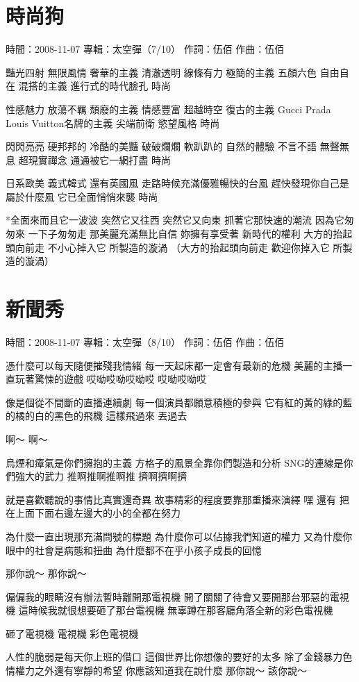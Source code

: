 \documentclass[UTF8,a4paper,oneside,twocolumn,12pt]{ctexbook}
\newcommand{\infopair}[2]{\textbullet #1：#2}
\newcommand{\zc}[1][伍佰]{\infopair{作詞}{#1}}
\newcommand{\zq}[1][伍佰]{\infopair{作曲}{#1}}
\newcommand{\zj}[1]{\infopair{專輯}{#1}}
\newcommand{\sj}[1]{\infopair{時間}{#1}}
\newenvironment{info}{\begin{flushleft}\kaishu
	}
	{\end{flushleft}\normalsize\yahei\par}
\newenvironment{lyric}{
	}
{}
\begin{document}
\section{時尚狗}
\begin{info}
	\sj{2008-11-07}
	\zj{太空彈（7/10）}
	\zc
	\zq
\end{info}
\begin{lyric}
	豔光四射 無限風情 奢華的主義
	清澈透明 線條有力 極簡的主義
	五顏六色 自由自在 混搭的主義
	進行式的時代臉孔 時尚

	性感魅力 放蕩不羈 頹廢的主義
	情感豐富 超越時空 復古的主義
	Gucci Prada Louis Vuitton名牌的主義
	尖端前衛 慾望風格 時尚

	閃閃亮亮 硬邦邦的 冷酷的美豔
	破破爛爛 軟趴趴的 自然的體驗
	不言不語 無聲無息 超現實禪念
	通通被它一網打盡 時尚

	日系歐美 義式韓式 還有英國風
	走路時候充滿優雅暢快的台風
	趕快發現你自己是屬於什麼風
	它已全面悄悄來襲 時尚

	*全面來而且它一波波 突然它又往西 突然它又向東
	抓著它那快速的潮流 因為它匆匆來 一下子匆匆走
	那美麗充滿無比自信 妳擁有享受著 新時代的權利
	大方的抬起頭向前走 不小心掉入它 所製造的漩渦
	（大方的抬起頭向前走 歡迎你掉入它 所製造的漩渦）
\end{lyric}

\section{新聞秀}
\begin{info}
	\sj{2008-11-07}
	\zj{太空彈（8/10）}
	\zc
	\zq
\end{info}
\begin{lyric}
	憑什麼可以每天隨便摧殘我情緒
	每一天起床都一定會有最新的危機
	美麗的主播一直玩著驚悚的遊戲
	哎呦哎呦哎呦哎 哎呦哎呦哎

	像是個從不間斷的直播連續劇
	每一個演員都願意積極的參與
	它有紅的黃的綠的藍的橘的白的黑色的飛機
	這樣飛過來 丟過去

	啊～
	啊～

	烏煙和瘴氣是你們擁抱的主義
	方格子的風景全靠你們製造和分析
	SNG的連線是你們強大的武力
	推啊推啊推啊推 擠啊擠啊擠

	就是喜歡聽說的事情比真實還奇異
	故事精彩的程度要靠那重播來演繹
	嘿 還有
	把在上面下面右邊左邊大的小的全都在努力

	為什麼一直出現那充滿問號的標題
	為什麼你可以佔據我們知道的權力
	又為什麼你眼中的社會是病態和扭曲
	為什麼都不在乎小孩子成長的回憶

	那你說～ 那你說～

	偏偏我的眼睛沒有辦法暫時離開那電視機
	開了關關了待會又要開那台邪惡的電視機
	這時候我就很想要砸了那台電視機
	無辜蹲在那客廳角落全新的彩色電視機

	砸了電視機 電視機 彩色電視機

	人性的脆弱是每天你上班的借口
	這個世界比你想像的要好的太多
	除了金錢暴力色情權力之外還有寧靜的希望
	你應該知道我在說什麼
	那你說～ 該你說～
\end{lyric}
\end{document}
